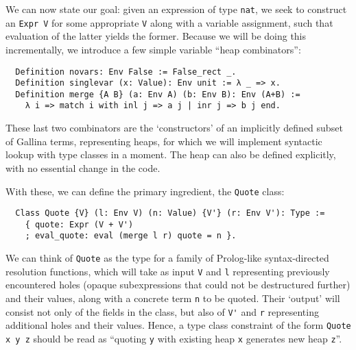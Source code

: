 \documentclass[a4paper,10pt,runningheads]{llncs}
\begin{document}


We can now state our goal: given an expression of type \lstinline|nat|, we seek to construct an \lstinline|Expr V| for some appropriate \lstinline|V| along with a variable assignment, such that evaluation of the latter yields the former. Because we will be doing this incrementally, we introduce a few simple variable ``heap combinators'':
\begin{lstlisting}
  Definition novars: Env False := False_rect _.
  Definition singlevar (x: Value): Env unit := λ _ => x.
  Definition merge {A B} (a: Env A) (b: Env B): Env (A+B) :=
    λ i => match i with inl j => a j | inr j => b j end.
\end{lstlisting}
These last two combinators are the `constructors' of an implicitly defined subset of Gallina terms, representing heaps, for which we will implement syntactic lookup with type classes in a moment. The heap can also be defined explicitly, with no essential change in the code.

With these, we can define the primary ingredient, the \lstinline|Quote| class:
\begin{lstlisting}
  Class Quote {V} (l: Env V) (n: Value) {V'} (r: Env V'): Type :=
    { quote: Expr (V + V')
    ; eval_quote: eval (merge l r) quote = n }.
\end{lstlisting}
We can think of \lstinline|Quote| as the type for a family of Prolog-like syntax-directed resolution functions, which will take as input \lstinline|V| and \lstinline|l| representing previously encountered holes (opaque subexpressions that could not be destructured further) and their values, along with a concrete term \lstinline|n| to be quoted. Their `output' will consist not only of the fields in the class, but also of \lstinline|V'| and \lstinline|r| representing additional holes and their values. Hence, a type class constraint of the form \lstinline|Quote x y z| should be read as ``quoting \lstinline|y| with existing heap \lstinline|x| generates new heap \lstinline|z|''.
\end{document}
